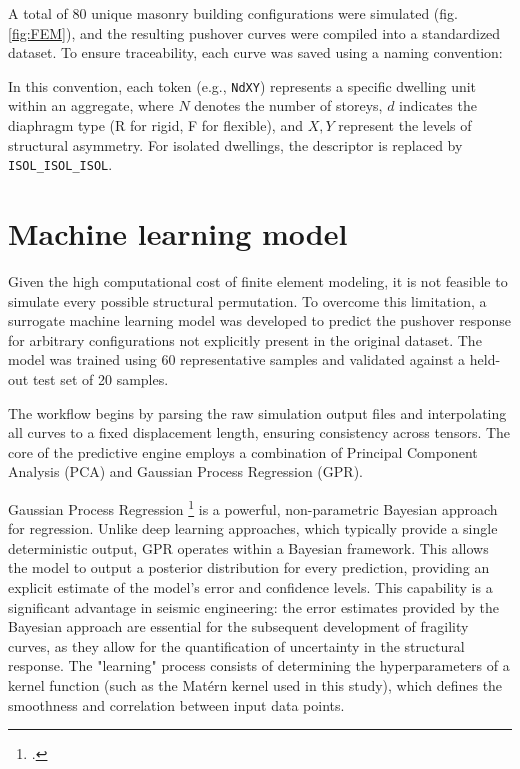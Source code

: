 \begin{refsection}
A total of 80 unique masonry building configurations were simulated (fig. \ref{fig:FEM}), and the resulting pushover curves were compiled into a standardized dataset. To ensure traceability, each curve was saved using a naming convention: 


In this convention, each token (e.g., \texttt{NdXY}) represents a specific dwelling unit within an aggregate, where $N$ denotes the number of storeys, $d$ indicates the diaphragm type (R for rigid, F for flexible), and $X, Y$ represent the levels of structural asymmetry. For isolated dwellings, the descriptor is replaced by \texttt{ISOL\_ISOL\_ISOL}.

\renewcommand{\sectionnametext}{Machine learning model}
\renewcommand{\headingtextR}{\thesection. \sectionnametext}
\section{\sectionnametext}

Given the high computational cost of finite element modeling, it is not feasible to simulate every possible structural permutation. To overcome this limitation, a surrogate machine learning model was developed to predict the pushover response for arbitrary configurations not explicitly present in the original dataset. The model was trained using 60 representative samples and validated against a held-out test set of 20 samples.

The workflow begins by parsing the raw simulation output files and interpolating all curves to a fixed displacement length, ensuring consistency across tensors. The core of the predictive engine employs a combination of Principal Component Analysis (PCA) and Gaussian Process Regression (GPR). 

Gaussian Process Regression \footcite{rasmussen2003gaussian} is a powerful, non-parametric Bayesian approach for regression. Unlike deep learning approaches, which typically provide a single deterministic output, GPR operates within a Bayesian framework. This allows the model to output a posterior distribution for every prediction, providing an explicit estimate of the model's error and confidence levels. This capability is a significant advantage in seismic engineering: the error estimates provided by the Bayesian approach are essential for the subsequent development of fragility curves, as they allow for the quantification of uncertainty in the structural response. The "learning" process consists of determining the hyperparameters of a kernel function (such as the Matérn kernel used in this study), which defines the smoothness and correlation between input data points. 


\end{refsection}

